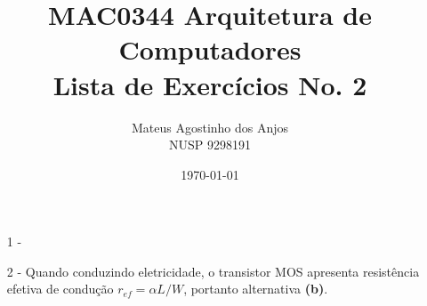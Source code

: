 \documentclass[12pt]{article}
\title{MAC0344 Arquitetura de Computadores\\
Lista de Exercícios No. 2
}
\author{Mateus Agostinho dos Anjos\\NUSP 9298191}
\date{\today}
\begin{document}
	\maketitle
	\begin{itemize}
		\item[1 -]
		
		\item[2 -]
			Quando conduzindo eletricidade, o transistor MOS apresenta
			resistência efetiva de condução $r_{ef} = \alpha L/W$,
			portanto alternativa \textbf{(b)}.
	\end{itemize}
\end{document}
